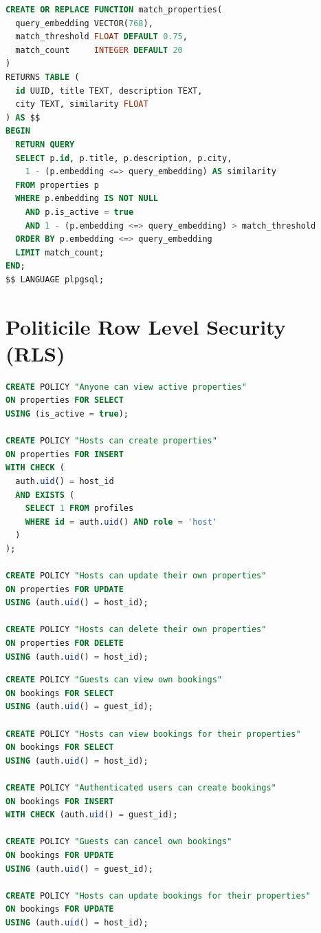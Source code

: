 \documentclass[12pt,a4paper,oneside]{report}
\begin{document}
\begin{lstlisting}[language=SQL, caption={Funcția match\_properties (pgvector)}]
CREATE OR REPLACE FUNCTION match_properties(
  query_embedding VECTOR(768),
  match_threshold FLOAT DEFAULT 0.75,
  match_count     INTEGER DEFAULT 20
)
RETURNS TABLE (
  id UUID, title TEXT, description TEXT,
  city TEXT, similarity FLOAT
) AS $$
BEGIN
  RETURN QUERY
  SELECT p.id, p.title, p.description, p.city,
    1 - (p.embedding <=> query_embedding) AS similarity
  FROM properties p
  WHERE p.embedding IS NOT NULL
    AND p.is_active = true
    AND 1 - (p.embedding <=> query_embedding) > match_threshold
  ORDER BY p.embedding <=> query_embedding
  LIMIT match_count;
END;
$$ LANGUAGE plpgsql;
\end{lstlisting}


\chapter{Politicile Row Level Security (RLS)}

\begin{lstlisting}[language=SQL, caption={Politici RLS pentru tabela properties}]
CREATE POLICY "Anyone can view active properties"
ON properties FOR SELECT
USING (is_active = true);

CREATE POLICY "Hosts can create properties"
ON properties FOR INSERT
WITH CHECK (
  auth.uid() = host_id
  AND EXISTS (
    SELECT 1 FROM profiles
    WHERE id = auth.uid() AND role = 'host'
  )
);

CREATE POLICY "Hosts can update their own properties"
ON properties FOR UPDATE
USING (auth.uid() = host_id);

CREATE POLICY "Hosts can delete their own properties"
ON properties FOR DELETE
USING (auth.uid() = host_id);
\end{lstlisting}

\begin{lstlisting}[language=SQL, caption={Politici RLS pentru tabela bookings}]
CREATE POLICY "Guests can view own bookings"
ON bookings FOR SELECT
USING (auth.uid() = guest_id);

CREATE POLICY "Hosts can view bookings for their properties"
ON bookings FOR SELECT
USING (auth.uid() = host_id);

CREATE POLICY "Authenticated users can create bookings"
ON bookings FOR INSERT
WITH CHECK (auth.uid() = guest_id);

CREATE POLICY "Guests can cancel own bookings"
ON bookings FOR UPDATE
USING (auth.uid() = guest_id);

CREATE POLICY "Hosts can update bookings for their properties"
ON bookings FOR UPDATE
USING (auth.uid() = host_id);
\end{lstlisting}
\end{document}
